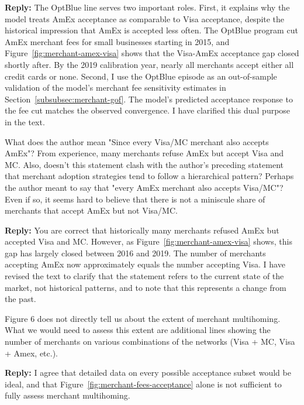 \documentclass[main.tex]{subfiles}
\begin{document}
\begin{refsection}
\begin{refcommentnoclear}
\end{refcommentnoclear}

\textbf{Reply:} The OptBlue line serves two important roles.
First, it explains why the model treats AmEx acceptance as comparable to Visa acceptance, despite the historical impression that AmEx is accepted less often.
The OptBlue program cut AmEx merchant fees for small businesses starting in 2015, and Figure~\ref{fig:merchant-amex-visa} shows that the Visa-AmEx acceptance gap closed shortly after.
By the 2019 calibration year, nearly all merchants accept either all credit cards or none.
Second, I use the OptBlue episode as an out-of-sample validation of the model's merchant fee sensitivity estimates in Section~\ref{subsubsec:merchant-gof}.
The model's predicted acceptance response to the fee cut matches the observed convergence.
I have clarified this dual purpose in the text.

\begin{refcommentnoclear}
What does the author mean "Since every Visa/MC merchant also accepts AmEx"?
From experience, many merchants refuse AmEx but accept Visa and MC.
Also, doesn't this statement clash with the author's preceding statement that merchant adoption strategies tend to follow a hierarchical pattern?
Perhaps the author meant to say that "every AmEx merchant also accepts Visa/MC"?
Even if so, it seems hard to believe that there is not a miniscule share of merchants that accept AmEx but not Visa/MC.
\end{refcommentnoclear}

\textbf{Reply:} You are correct that historically many merchants refused AmEx but accepted Visa and MC.
However, as Figure~\ref{fig:merchant-amex-visa} shows, this gap has largely closed between 2016 and 2019.
The number of merchants accepting AmEx now approximately equals the number accepting Visa.
I have revised the text to clarify that the statement refers to the current state of the market, not historical patterns, and to note that this represents a change from the past.

\begin{refcommentnoclear}
Figure 6 does not directly tell us about the extent of merchant multihoming.
What we would need to assess this extent are additional lines showing the number of merchants on various combinations of the networks (Visa + MC, Visa + Amex, etc.).

\end{refcommentnoclear}

\textbf{Reply:} I agree that detailed data on every possible acceptance subset would be ideal, and that Figure~\ref{fig:merchant-fees-acceptance} alone is not sufficient to fully assess merchant multihoming.


\end{refsection}
\end{document}
